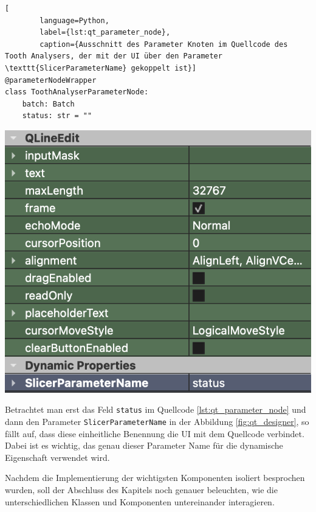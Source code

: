 \begin{minipage}{0.55\textwidth}
	\centering
	\begin{lstlisting}[
		language=Python,
		label={lst:qt_parameter_node},
		caption={Ausschnitt des Parameter Knoten im Quellcode des Tooth Analysers, der mit der UI über den Parameter \texttt{SlicerParameterName} gekoppelt ist}]
@parameterNodeWrapper
class ToothAnalyserParameterNode:
    batch: Batch
    status: str = ""
    \end{lstlisting}
\end{minipage}
\hfill
\begin{minipage}{0.35\textwidth}
	\centering
	\includegraphics[width=\textwidth]{img/qt_designer.png}
	 \label{fig:qt_designer}
\end{minipage}

Betrachtet man erst das Feld \texttt{status} im Quellcode
\ref{lst:qt_parameter_node} und dann den Parameter \texttt{SlicerParameterName} in
der Abbildung \ref{fig:qt_designer}, so fällt auf, dass diese einheitliche Benennung
die \ac{UI} mit dem Quellcode verbindet. Dabei ist es wichtig, das genau dieser
Parameter Name für die dynamische Eigenschaft verwendet wird.

Nachdem die Implementierung der wichtigsten Komponenten isoliert besprochen
wurden, soll der Abschluss des Kapitels noch genauer beleuchten, wie die
unterschiedlichen Klassen und Komponenten untereinander interagieren.

